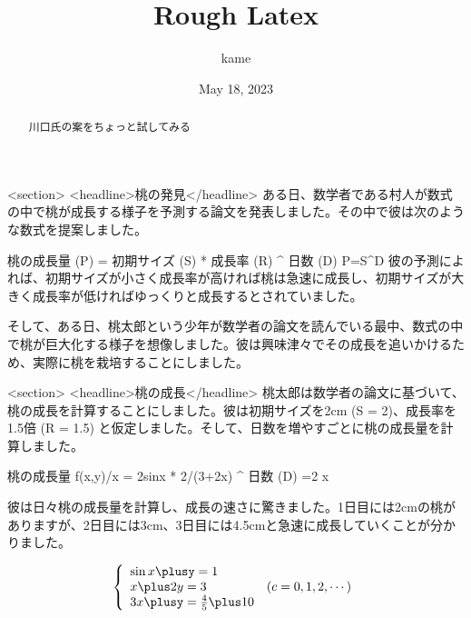 \documentclass[titlepage]{jsarticle}
\title{Rough Latex}
\author{kame}
\date{May 18, 2023}
\begin{document}
\maketitle

\begin{abstract}川口氏の案をちょっと試してみる\end{abstract}
<section>
<headline>桃の発見</headline>
ある日、数学者である村人が数式の中で桃が成長する様子を予測する論文を発表しました。その中で彼は次のような数式を提案しました。

桃の成長量 (P) = 初期サイズ (S) * 成長率 (R) ^ 日数 (D)
P=S\timesR^D
彼の予測によれば、初期サイズが小さく成長率が高ければ桃は急速に成長し、初期サイズが大きく成長率が低ければゆっくりと成長するとされていました。

そして、ある日、桃太郎という少年が数学者の論文を読んでいる最中、数式の中で桃が巨大化する様子を想像しました。彼は興味津々でその成長を追いかけるため、実際に桃を栽培することにしました。

<section>
<headline>桃の成長</headline>
桃太郎は数学者の論文に基づいて、桃の成長を計算することにしました。彼は初期サイズを2cm (S = 2)、成長率を1.5倍 (R = 1.5) と仮定しました。そして、日数を増やすごとに桃の成長量を計算しました。

桃の成長量 f(x,y)/x  = 2sinx * 2/(3+2x) ^ {日数 (D)}
=2 \sin x\times{}

彼は日々桃の成長量を計算し、成長の速さに驚きました。1日目には2cmの桃がありますが、2日目には3cm、3日目には4.5cmと急速に成長していくことが分かりました。


\[
\left\{
\begin{array}{ll}
 \sin x\plusy=1 \\
x\plus2y=3 & (c=0,1,2,\cdots)  \\
3x\plusy=\frac{4}{5}\plus10 \\
\end{array}
\right.
\]
\end{document}
